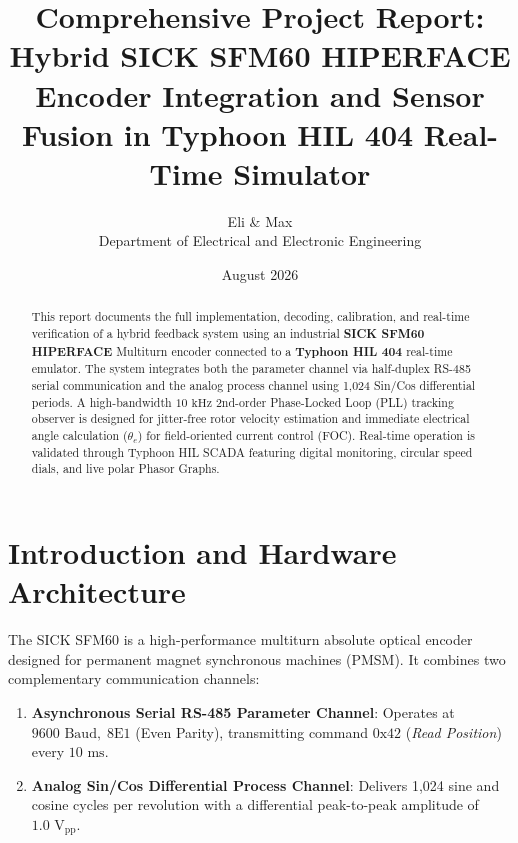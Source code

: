 \documentclass[11pt,a4paper]{article}
\title{\textbf{\Large Comprehensive Project Report: Hybrid SICK SFM60 HIPERFACE Encoder Integration and Sensor Fusion in Typhoon HIL 404 Real-Time Simulator}}
\author{Eli \& Max \\ Department of Electrical and Electronic Engineering}
\date{August 2026}
\begin{document}
\maketitle

\begin{abstract}
This report documents the full implementation, decoding, calibration, and real-time verification of a hybrid feedback system using an industrial \textbf{SICK SFM60 HIPERFACE} Multiturn encoder connected to a \textbf{Typhoon HIL 404} real-time emulator. The system integrates both the parameter channel via half-duplex RS-485 serial communication and the analog process channel using 1,024 Sin/Cos differential periods. A high-bandwidth $10\text{ kHz}$ 2nd-order Phase-Locked Loop (PLL) tracking observer is designed for jitter-free rotor velocity estimation and immediate electrical angle calculation ($\theta_e$) for field-oriented current control (FOC). Real-time operation is validated through Typhoon HIL SCADA featuring digital monitoring, circular speed dials, and live polar Phasor Graphs.
\end{abstract}

\section{Introduction and Hardware Architecture}
The SICK SFM60 is a high-performance multiturn absolute optical encoder designed for permanent magnet synchronous machines (PMSM). It combines two complementary communication channels:
\begin{enumerate}
    \item \textbf{Asynchronous Serial RS-485 Parameter Channel}: Operates at $9600\text{ Baud},\; 8\text{E}1$ (Even Parity), transmitting command $\text{0x42}$ (\textit{Read Position}) every $10\text{ ms}$.
    \item \textbf{Analog Sin/Cos Differential Process Channel}: Delivers 1,024 sine and cosine cycles per revolution with a differential peak-to-peak amplitude of $1.0\text{ V}_{\text{pp}}$.
\end{enumerate}
\end{document}
